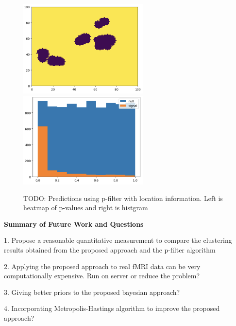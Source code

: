\documentclass[12pt]{article}
\begin{document}
\begin{figure}[h]
\caption{TODO: Predictions using p-filter with location information. Left is heatmap of p-values and right is histgram}
\includegraphics[width=6.5cm]{baygrid}
\includegraphics[width=6.5cm]{bayhist}
\end{figure}


\vspace{1em}
{\bf Summary of Future Work and Questions}

1. Propose a reasonable quantitative measurement to compare the clustering results obtained from the proposed approach and the p-filter algorithm 

2. Applying the proposed approach to real fMRI data can be very computationally expensive. Run on server or reduce the problem?

3. Giving better priors to the proposed bayesian approach?

4. Incorporating Metropolis-Hastings algorithm to improve the proposed approach?



\end{document}
